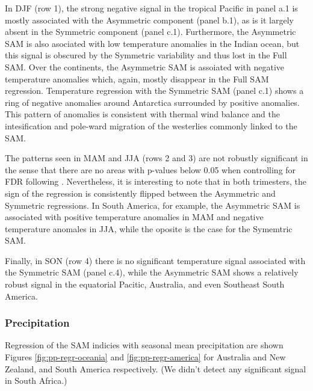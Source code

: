 \documentclass[]{ametsocV5}
\begin{document}
In DJF (row 1), the strong negative signal in the tropical Pacific in
panel a.1 is mostly associated with the Asymmetric component (panel
b.1), as is it largely absent in the Symmetric component (panel c.1).
Furthermore, the Asymmetric SAM is also asociated with low temperature
anomalies in the Indian ocean, but this signal is obscured by the
Symmetric variability and thus lost in the Full SAM. Over the
continents, the Asymmetric SAM is assoiated with negative temperature
anomalies which, again, mostly disappear in the Full SAM regression.
Temperature regression with the Symmetric SAM (panel c.1) shows a ring
of negative anomalies around Antarctica surrounded by positive
anomalies. This pattern of anomalies is consistent with thermal wind
balance and the intesification and pole-ward migration of the westerlies
commonly linked to the SAM.

The patterns seen in MAM and JJA (rows 2 and 3) are not robustly
significant in the sense that there are no areas with p-values below
0.05 when controlling for FDR following \citet{wilks2016}. Nevertheless,
it is interesting to note that in both trimesters, the sign of the
regression is consistently flipped between the Asymmetric and Symmetric
regressions. In South America, for example, the Asymmetric SAM is
associated with positive temperature anomalies in MAM and negative
temperature anomales in JJA, while the oposite is the case for the
Symemtric SAM.

Finally, in SON (row 4) there is no significant temperature signal
associated with the Symmetric SAM (panel c.4), while the Asymmetric SAM
shows a relatively robust signal in the equatorial Pacitic, Australia,
and even Southeast South America.

\subsubsection{Precipitation}

Regression of the SAM indicies with seasonal mean precipitation are
shown Figures \ref{fig:pp-regr-oceania} and \ref{fig:pp-regr-america}
for Australia and New Zealand, and South America respectively. (We
didn't detect any significant signal in South Africa.)
\end{document}
